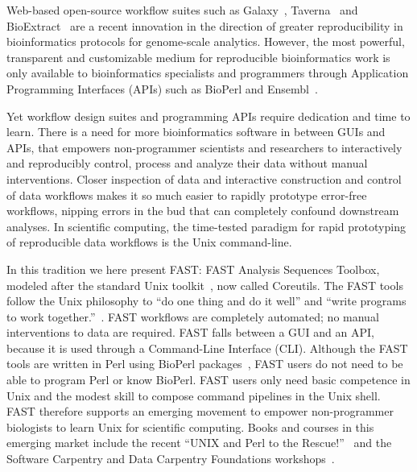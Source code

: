 \documentclass{frontiersSCNS} %
\begin{document}
Web-based open-source workflow suites such as Galaxy~\citep{galaxy14},
Taverna~\citep{CPE:CPE993} and BioExtract~\citep{Lushbough01072011}
are a recent innovation in the direction of greater reproducibility in
bioinformatics protocols for genome-scale analytics. However, the most
powerful, transparent and customizable medium for reproducible
bioinformatics work is only available to bioinformatics specialists
and programmers through Application Programming Interfaces (APIs) such
as BioPerl and Ensembl~\citep{Yates01012015}. 

Yet workflow design suites and programming APIs require dedication and
time to learn.  There is a need for more bioinformatics software
in between GUIs and APIs, that empowers non-programmer scientists and
researchers to interactively and reproducibly control, process and
analyze their data without manual interventions. Closer inspection of
data and interactive construction and control of data workflows makes
it so much easier to rapidly prototype error-free workflows, nipping
errors in the bud that can completely confound downstream analyses.
In scientific computing, the time-tested paradigm for rapid
prototyping of reproducible data workflows is the Unix command-line.

In this tradition we here present FAST: FAST Analysis Sequences
Toolbox, modeled after the standard Unix toolkit~\citep{Peek2001}, now
called Coreutils.  The FAST tools follow the Unix philosophy to ``do
one thing and do it well'' and ``write programs to work
together.''~\citep{Stutz2000}. FAST workflows are completely
automated; no manual interventions to data are required.  FAST falls
between a GUI and an API, because it is used through a Command-Line
Interface (CLI).  Although the FAST tools are written in Perl using
BioPerl packages~\citep{Stajich2002}, FAST users do not need to be
able to program Perl or know BioPerl. FAST users only need basic
competence in Unix and the modest skill to compose command pipelines
in the Unix shell.  FAST therefore supports an emerging movement to
empower non-programmer biologists to learn Unix for scientific
computing. Books and courses in this emerging market include the
recent ``UNIX and Perl to the Rescue!''~\citep{bradnam2012unix} and
the Software Carpentry and Data Carpentry Foundations
workshops~\citep{wilson_software_2014}.
\end{document}
